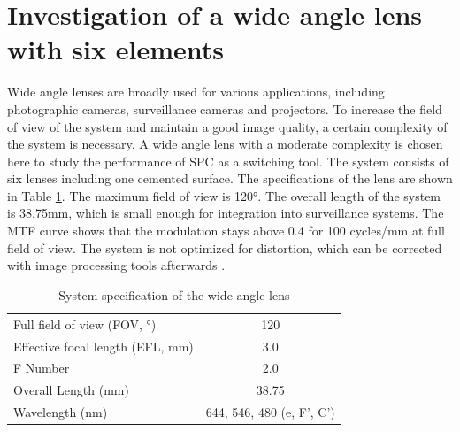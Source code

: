 \section{Investigation of a wide angle lens with six elements}
Wide angle lenses are broadly used for various applications, including photographic cameras, surveillance cameras and projectors. To increase the field of view of the system and maintain a good image quality, a certain complexity of the system is necessary. A wide angle lens with a moderate complexity is chosen here to study the performance of SPC as a switching tool. The system consists of six lenses including one cemented surface. The specifications of the lens are shown in Table \ref{table: sysspecWAL}. The maximum field of view is 120°. The overall length of the system is 38.75mm, which is small enough for integration into surveillance systems. The MTF curve shows that the modulation stays above 0.4 for 100 cycles/mm at full field of view. The system is not optimized for distortion, which can be corrected with image processing tools afterwards \cite{Sahin:18DisCorrec}.

\setlength{\arrayrulewidth}{.5mm}
\setlength{\tabcolsep}{18pt}
\renewcommand{\arraystretch}{1.2}
\begin{table}[h!]
    \centering
    \captionsetup{justification=centering}
    \caption{System specification of the wide-angle lens}
    \label{table: sysspecWAL}
    \vspace{-1em}
    \begin{tabular}{ p{20em} c }
    \hline 
    Full field of view (FOV, °) & 120\\
    Effective focal length (EFL, mm) & 3.0\\
    F Number & 2.0\\
    Overall Length (mm) & 38.75\\
    Wavelength (nm) & 644, 546, 480 (e, F', C')\\
    \hline
    \end{tabular}
\end{table}


